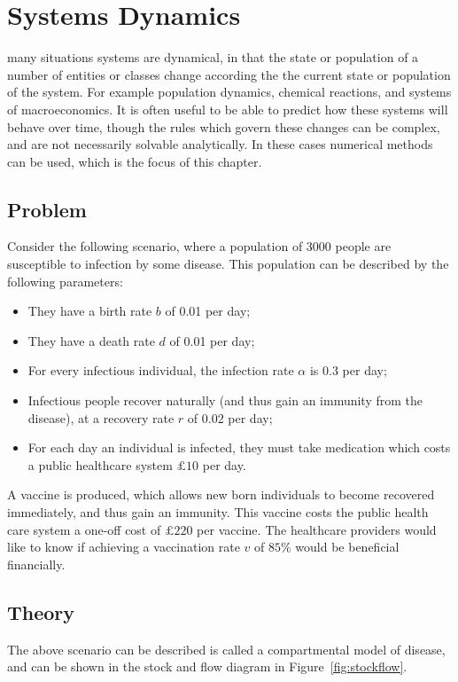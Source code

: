 \chapter[Systems dynamics]{Systems Dynamics}

 many situations systems are dynamical, in that the state
or population of a number of entities or classes change according the the
current state or population of the system. For example population dynamics,
chemical reactions, and systems of macroeconomics. It is often useful to be able
to predict how these systems will behave over time, though the rules which
govern these changes can be complex, and are not necessarily solvable
analytically. In these cases numerical methods can be used, which is the focus
of this chapter.

\section{Problem}\label{sec:problem}
Consider the following scenario, where a population of 3000 people are
susceptible to infection by some disease. This population can be described by
the following parameters:

\begin{itemize}
  \item They have a birth rate $b$ of 0.01 per day;
  \item They have a death rate $d$ of 0.01 per day;
  \item For every infectious individual, the infection rate $\alpha$ is 0.3 per
  day;
  \item Infectious people recover naturally (and thus gain an immunity from the
  disease), at a recovery rate $r$ of 0.02 per day;
  \item For each day an individual is infected, they must take medication which
  costs a public healthcare system $\pounds 10$ per day.
\end{itemize}

A vaccine is produced, which allows new born individuals to become recovered
immediately, and thus gain an immunity. This vaccine costs the public health
care system a one-off cost of $\pounds 220$ per vaccine. The healthcare
providers would like to know if achieving a vaccination rate $v$ of $85\%$ would
be beneficial financially.

\section{Theory}\label{sec:theory}
The above scenario can be described is called a compartmental model of disease, and can be shown in the stock and flow diagram in Figure~\ref{fig:stockflow}.

